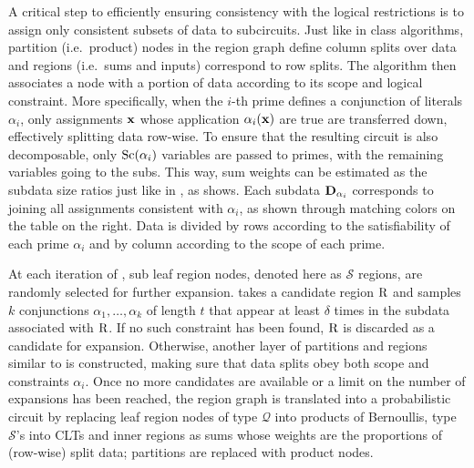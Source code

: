 A critical step to efficiently ensuring consistency with the logical restrictions is to assign only
consistent subsets of data to subcircuits. Just like in \divclass{} class algorithms, partition
(i.e.\ product) nodes in the region graph define column splits over data and regions (i.e.\ sums
and inputs) correspond to row splits. The algorithm then associates a node with a portion of data
according to its scope and logical constraint. More specifically, when the $i$-th prime defines a
conjunction of literals $\alpha_i$, only assignments $\mathbf{x}$ whose application
$\alpha_i(\mathbf{x})$ are true are transferred down, effectively splitting data row-wise. To ensure
that the resulting circuit is also decomposable, only $\operatorname*{\normalfont{Sc}}(\alpha_i)$ variables are passed to
primes, with the remaining variables going to the subs. This way, sum weights can be estimated as
the subdata size ratios just like in , as  shows. Each subdata
$\mathbf{D}_{\alpha_i}$ corresponds to joining all assignments consistent with $\alpha_i$, as shown
through matching colors on the table on the right. Data is divided by rows according to the
satisfiability of each prime $\alpha_i$ and by column according to the scope of each prime.

At each iteration of , sub leaf region nodes, denoted here as $\mathcal{S}$ regions,
are randomly selected for further expansion.  takes a candidate region
$\operatorname{\textrm{R}}$ and samples $k$ conjunctions $\alpha_1,\ldots,\alpha_k$ of length $t$ that appear at
least $\delta$ times in the subdata associated with $\operatorname{\textrm{R}}$. If no such constraint has been
found, $\operatorname{\textrm{R}}$ is discarded as a candidate for expansion. Otherwise, another layer of partitions
and regions similar to  is constructed, making sure that data splits obey both scope
and constraints $\alpha_i$. Once no more candidates are available or a limit on the number of
expansions has been reached, the region graph is translated into a probabilistic circuit by
replacing leaf region nodes of type $\mathcal{Q}$ into products of Bernoullis, type $\mathcal{S}$'s
into CLTs and inner regions as sums whose weights are the proportions of (row-wise) split data;
partitions are replaced with product nodes.


